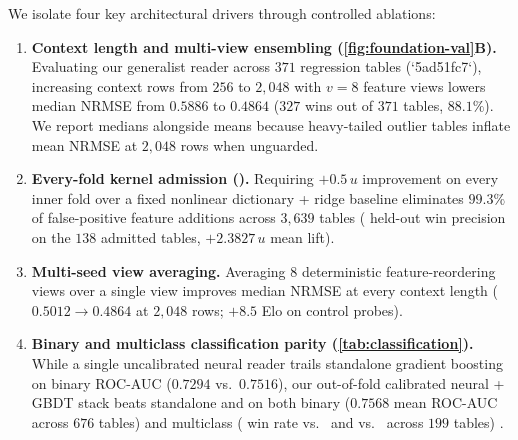 We isolate four key architectural drivers through controlled ablations:
\begin{enumerate}
  \item \textbf{Context length and multi-view ensembling (\cref{fig:foundation-val}B).} Evaluating our generalist reader across $371$ regression tables (`5ad51fc7`), increasing context rows from $256$ to $2{,}048$ with $v=8$ feature views lowers median NRMSE from $0.5886$ to \textbf{$0.4864$} ($327$ wins out of $371$ tables, $88.1\%$). We report medians alongside means because heavy-tailed outlier tables inflate mean NRMSE at $2{,}048$ rows when unguarded.
  \item \textbf{Every-fold kernel admission ().} Requiring $+0.5\,u$ improvement on every inner fold over a fixed nonlinear dictionary + ridge baseline eliminates $99.3\%$ of false-positive feature additions across $3{,}639$ tables (\BHKernelGatePrec{} held-out win precision on the $138$ admitted tables, $+2.3827\,u$ mean lift).
  \item \textbf{Multi-seed view averaging.} Averaging $8$ deterministic feature-reordering views over a single view improves median NRMSE at every context length ($0.5012 \to 0.4864$ at $2{,}048$ rows; $+8.5$ Elo on  control probes).
  \item \textbf{Binary and multiclass classification parity (\cref{tab:classification}).} While a single uncalibrated neural reader trails standalone gradient boosting on binary ROC-AUC ($0.7294$ vs.\ $0.7516$), our out-of-fold calibrated neural + GBDT stack beats standalone  and  on both binary ($0.7568$ mean ROC-AUC across $676$ tables) and multiclass (\BHMulticlassWinCat{} win rate vs.\  and \BHMulticlassWinLGBM{} vs.\  across $199$ tables) \est{}.
\end{enumerate}
